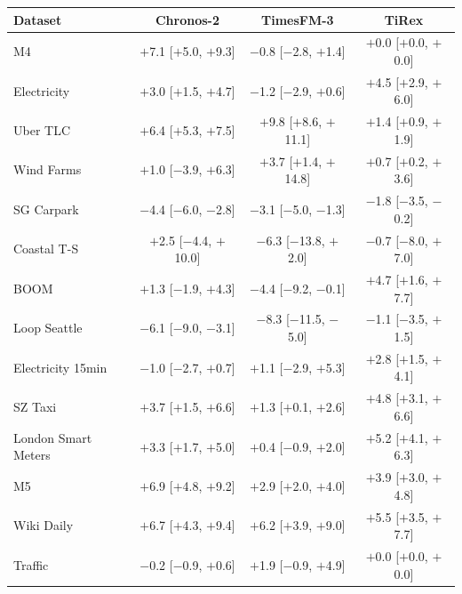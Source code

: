 \begin{tabular}{lccc}
\toprule
Dataset & Chronos-2 & TimesFM-3 & TiRex \\
\midrule
M4 & $+$7.1 [$+$5.0, $+$9.3] & $-$0.8 [$-$2.8, $+$1.4] & $+$0.0 [$+$0.0, $+$0.0] \\
Electricity & $+$3.0 [$+$1.5, $+$4.7] & $-$1.2 [$-$2.9, $+$0.6] & $+$4.5 [$+$2.9, $+$6.0] \\
Uber TLC & $+$6.4 [$+$5.3, $+$7.5] & $+$9.8 [$+$8.6, $+$11.1] & $+$1.4 [$+$0.9, $+$1.9] \\
Wind Farms & $+$1.0 [$-$3.9, $+$6.3] & $+$3.7 [$+$1.4, $+$14.8] & $+$0.7 [$+$0.2, $+$3.6] \\
SG Carpark & $-$4.4 [$-$6.0, $-$2.8] & $-$3.1 [$-$5.0, $-$1.3] & $-$1.8 [$-$3.5, $-$0.2] \\
Coastal T-S & $+$2.5 [$-$4.4, $+$10.0] & $-$6.3 [$-$13.8, $+$2.0] & $-$0.7 [$-$8.0, $+$7.0] \\
BOOM & $+$1.3 [$-$1.9, $+$4.3] & $-$4.4 [$-$9.2, $-$0.1] & $+$4.7 [$+$1.6, $+$7.7] \\
Loop Seattle & $-$6.1 [$-$9.0, $-$3.1] & $-$8.3 [$-$11.5, $-$5.0] & $-$1.1 [$-$3.5, $+$1.5] \\
Electricity 15min & $-$1.0 [$-$2.7, $+$0.7] & $+$1.1 [$-$2.9, $+$5.3] & $+$2.8 [$+$1.5, $+$4.1] \\
SZ Taxi & $+$3.7 [$+$1.5, $+$6.6] & $+$1.3 [$+$0.1, $+$2.6] & $+$4.8 [$+$3.1, $+$6.6] \\
London Smart Meters & $+$3.3 [$+$1.7, $+$5.0] & $+$0.4 [$-$0.9, $+$2.0] & $+$5.2 [$+$4.1, $+$6.3] \\
M5 & $+$6.9 [$+$4.8, $+$9.2] & $+$2.9 [$+$2.0, $+$4.0] & $+$3.9 [$+$3.0, $+$4.8] \\
Wiki Daily & $+$6.7 [$+$4.3, $+$9.4] & $+$6.2 [$+$3.9, $+$9.0] & $+$5.5 [$+$3.5, $+$7.7] \\
Traffic & $-$0.2 [$-$0.9, $+$0.6] & $+$1.9 [$-$0.9, $+$4.9] & $+$0.0 [$+$0.0, $+$0.0] \\
\bottomrule
\end{tabular}
